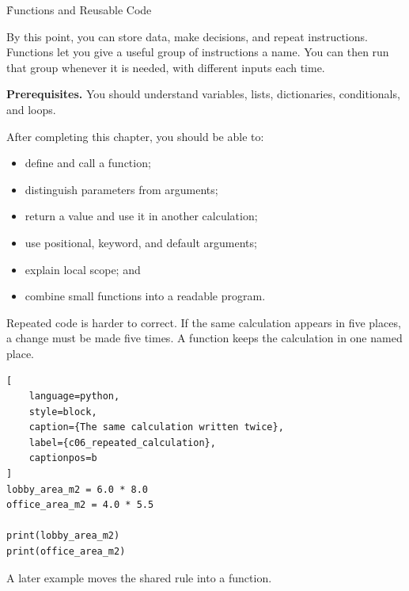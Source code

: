 
\h{Functions and Reusable Code}
\label{ch:06}

By this point, you can store data, make decisions, and repeat instructions.
Functions let you give a useful group of instructions a name. You can then run
that group whenever it is needed, with different inputs each time.

\begin{NoteBox}
\textbf{Prerequisites.} You should understand variables, lists, dictionaries,
conditionals, and loops.
\end{NoteBox}

\begin{tcolorbox}[title=Learning outcomes,colframe=orange,colback=white,arc=2mm]
After completing this chapter, you should be able to:
\begin{itemize}
    \item define and call a function;
    \item distinguish parameters from arguments;
    \item return a value and use it in another calculation;
    \item use positional, keyword, and default arguments;
    \item explain local scope; and
    \item combine small functions into a readable program.
\end{itemize}
\end{tcolorbox}


Repeated code is harder to correct. If the same calculation appears in five
places, a change must be made five times. A function keeps the calculation in
one named place.

\begin{lstlisting}[
    language=python,
    style=block,
    caption={The same calculation written twice},
    label={c06_repeated_calculation},
    captionpos=b
]
lobby_area_m2 = 6.0 * 8.0
office_area_m2 = 4.0 * 5.5

print(lobby_area_m2)
print(office_area_m2)
\end{lstlisting}

A later example moves the shared rule into a function.


